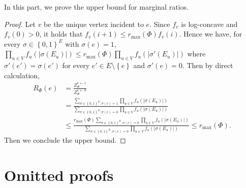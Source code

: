 \documentclass[11pt]{article}
\newcommand{\abs}[1]{\left\vert#1\right\vert}
\newcommand{\set}[1]{\left\{#1\right\}}
\def\!#1{\mathtt{#1}}
\begin{document}
In this part, we prove the upper bound for marginal ratios.

\MarginalRatioBound*
\begin{proof}
    Let $v$ be the unique vertex incident to $e$. Since $f_v$ is log-concave and $f_v(0) > 0$, it holds that $f_v(i + 1) \le r_{\max}(\Phi) f_v(i)$. Hence we have, for every $\sigma \in \set{0, 1}^E$ with $\sigma(e) = 1$, $\prod_{u \in V} f_u\left(\abs{\sigma(E_u)}\right) \le r_{\max}(\Phi) \prod_{u \in V} f_u\left(\abs{\sigma'(E_u)}\right)$ where $\sigma'(e') = \sigma(e')$ for every $e' \in E \setminus \set{e}$ and $\sigma'(e) = 0$. Then by direct calculation,
    \begin{align*}
        R_{\Phi}(e) &= \frac{Z_{\Phi}^{e \gets 1}}{Z_{\Phi}^{e \gets 0}} \\
        &= \frac{\sum_{\sigma \in \set{0, 1}^E : \sigma(e) = 1} \prod_{u \in V} f_u\left(\abs{\sigma(E_u)}\right)}{\sum_{\sigma \in \set{0, 1}^E : \sigma(e) = 0} \prod_{u \in V} f_u\left(\abs{\sigma(E_u)}\right)} \\
        &\le \frac{r_{\max}(\Phi) \sum_{\sigma \in \set{0, 1}^E : \sigma(e) = 0} \prod_{u \in V} f_u\left(\abs{\sigma(E_u)}\right)}{\sum_{\sigma \in \set{0, 1}^E : \sigma(e) = 0} \prod_{u \in V} f_u\left(\abs{\sigma(E_u)}\right)} \le r_{\max}(\Phi).
    \end{align*}
    Then we conclude the upper bound.
\end{proof}

\section{Omitted proofs}\label{sec:omitted Proofs}

\end{document}
